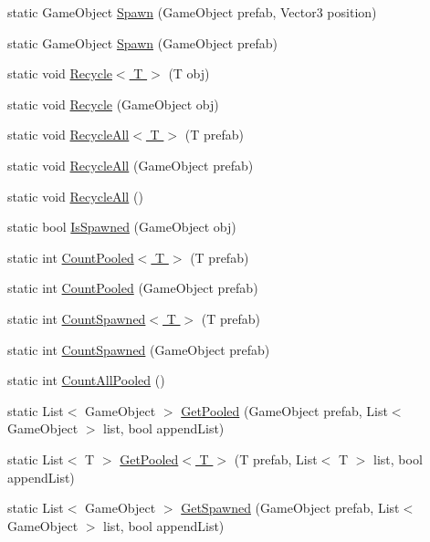 \begin{DoxyCompactItemize}
\item 
static Game\+Object \hyperlink{class_object_pool_a8c54ceead77ff0cf8fc3b0ca96bc6cbf}{Spawn} (Game\+Object prefab, Vector3 position)
\item 
static Game\+Object \hyperlink{class_object_pool_a91648c2c53cc44d27fb83d8e1335a8c1}{Spawn} (Game\+Object prefab)
\item 
static void \hyperlink{class_object_pool_ae4823fca4c3fcdde54ad7b807eb31e48}{Recycle$<$ T $>$} (T obj)
\item 
static void \hyperlink{class_object_pool_add1b881196c057e119227c85c7b0ed74}{Recycle} (Game\+Object obj)
\item 
static void \hyperlink{class_object_pool_ae2fbe481953b5c767f8a581a6106a77e}{Recycle\+All$<$ T $>$} (T prefab)
\item 
static void \hyperlink{class_object_pool_a36e5adc797bedaf0b2906b1286dd58d1}{Recycle\+All} (Game\+Object prefab)
\item 
static void \hyperlink{class_object_pool_a882af948ed3280740b6a0a2d02256e69}{Recycle\+All} ()
\item 
static bool \hyperlink{class_object_pool_a0c5a28b7f337118b1619637bcac1ec19}{Is\+Spawned} (Game\+Object obj)
\item 
static int \hyperlink{class_object_pool_a5876a8c0ec6c0ed6ecd91b289212b261}{Count\+Pooled$<$ T $>$} (T prefab)
\item 
static int \hyperlink{class_object_pool_a5daa69415dd14071f05770dfcf3a5a39}{Count\+Pooled} (Game\+Object prefab)
\item 
static int \hyperlink{class_object_pool_a47d37208137e396aafd12cf2e7437cba}{Count\+Spawned$<$ T $>$} (T prefab)
\item 
static int \hyperlink{class_object_pool_adf9581d14685a9eb7342f2ce6988f8ec}{Count\+Spawned} (Game\+Object prefab)
\item 
static int \hyperlink{class_object_pool_a7ecbc4414712523a704f19df912db1f9}{Count\+All\+Pooled} ()
\item 
static List$<$ Game\+Object $>$ \hyperlink{class_object_pool_a4c66b4b085910a6182484b3507136b4e}{Get\+Pooled} (Game\+Object prefab, List$<$ Game\+Object $>$ list, bool append\+List)
\item 
static List$<$ T $>$ \hyperlink{class_object_pool_a8811c224a21b3be981c6a94bd7318de7}{Get\+Pooled$<$ T $>$} (T prefab, List$<$ T $>$ list, bool append\+List)
\item 
static List$<$ Game\+Object $>$ \hyperlink{class_object_pool_a9d4e7075c13216a1384adcb4dd302d69}{Get\+Spawned} (Game\+Object prefab, List$<$ Game\+Object $>$ list, bool append\+List)

\end{DoxyCompactItemize}
